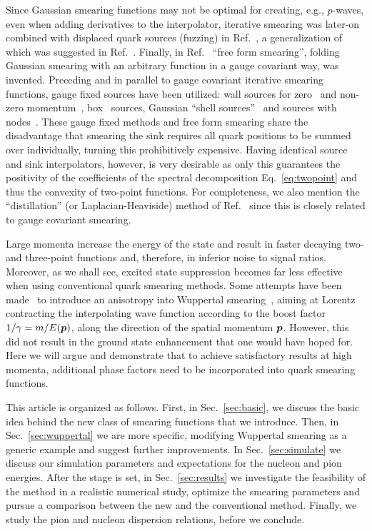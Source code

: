 Since Gaussian smearing functions may not be optimal for creating, e.g.,
$p$-waves, even when adding derivatives to the interpolator,
iterative smearing was later-on combined with
displaced quark sources (fuzzing) in Ref.~\cite{Lacock:1994qx},
a generalization of which was suggested in Ref.~\cite{Boyle:1999gx}.
Finally, in Ref.~\cite{vonHippel:2013yfa} ``free form smearing'',
folding Gaussian smearing with an arbitrary function in a gauge
covariant way, was invented. Preceding and in parallel to
gauge covariant iterative smearing functions, gauge fixed sources have
been utilized: wall sources for zero~\cite{Bacilieri:1988fh} and
non-zero momentum~\cite{Detmold:2012wc}, box~\cite{Allton:1990qg}
sources, Gaussian ``shell sources''~\cite{DeGrand:1990dz}
and sources with nodes~\cite{DeGrand:1991ng}.
These gauge fixed methods and free form smearing share the disadvantage
that smearing the sink requires all quark positions to
be summed over individually, turning this prohibitively expensive.
Having identical source and sink interpolators,
however, is very desirable as only this guarantees the
positivity of the coefficients of the spectral decomposition
Eq.~\eqref{eq:twopoint} and thus the convexity of two-point functions.
For completeness, we also mention the ``distillation'' (or
Laplacian-Heaviside) method of Ref.~\cite{Peardon:2009gh}
since this is closely related to gauge covariant smearing.

Large momenta increase the energy of the state and result in faster
decaying two- and three-point functions and, therefore, in inferior noise to
signal ratios. Moreover, as we shall see,
excited state suppression becomes far less effective when
using conventional quark smearing methods.
Some attempts have been
made~\cite{Roberts:2012tp,DellaMorte:2012xc}
to introduce an anisotropy into Wuppertal
smearing~\cite{Gusken:1989ad,Gusken:1989qx}, aiming at
Lorentz contracting the interpolating wave function
according to the boost factor $1/\gamma=m/E(\boldsymbol{p})$,
along the direction of the spatial
momentum $\boldsymbol{p}$. However,
this did not result in the ground state enhancement that one would have
hoped for. Here we will argue and demonstrate that to achieve satisfactory
results at high momenta, additional phase factors need to be incorporated
into quark smearing functions.

This article is organized as follows.
First, in Sec.~\ref{sec:basic}, we discuss the basic idea behind the new
class of smearing functions that we introduce.
Then, in Sec.~\ref{sec:wuppertal} we are more specific, modifying
Wuppertal smearing as a generic example and suggest further improvements.
In Sec.~\ref{sec:simulate} we discuss our simulation
parameters and expectations for
the nucleon and pion energies. After the stage is set,
in Sec.~\ref{sec:results} we investigate the feasibility of the method
in a realistic numerical study, optimize the smearing parameters and pursue a
comparison between the new and the conventional method. Finally,
we study the pion and nucleon dispersion relations, before we conclude.

